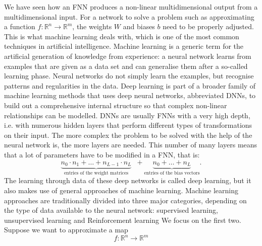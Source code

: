 We have seen how an FNN produces a non-linear multidimensional output from a multidimensional input. For a network to solve a problem such as approximating a function $f \colon \mathbb{R}^n \to \mathbb{R}^m$, the weights $W$ and biases $b$ need to be properly adjusted. This is what machine learning deals with, which is one of the most common techniques in artificial intelligence. Machine learning is a generic term for the artificial generation of knowledge from experience: a neural network learns from examples that are given as a data set and can generalise them after a so-called learning phase. Neural networks do not simply learn the examples, but recognise patterns and regularities in the data. Deep learning is part of a broader family of machine learning methods that uses deep neural networks, abbreviated DNNs, to build out a comprehensive internal structure so that complex non-linear relationships can be modelled. DNNs are usually FNNs with a very high depth, i.e. with numerous hidden layers that perform different types of transformations on their input. The more complex the problem to be solved with the help of the neural network is, the more layers are needed. This number of many layers means that a lot of parameters have to be modified in a FNN, that is:
\begin{equation*}
    \underbrace{n_0 \cdot n_1 + \ldots + n_{L-1} \cdot n_L}_{\text{entries of the weight matrices}} \; \; + \underbrace{n_0 + \ldots + n_L}_{\text{entries of the bias vectors}}.
\end{equation*}
The learning through data of these deep networks is called deep learning, but it also makes use of general approaches of machine learning. Machine learning approaches are traditionally divided into three major categories, depending on the type of data available to the neural network: supervised learning, unsupervised learning and Reinforcement learning We focus on the first two. \\
Suppose we want to approximate a map
\begin{equation*}
    f \colon \mathbb{R}^n \to \mathbb{R}^m
\end{equation*}
